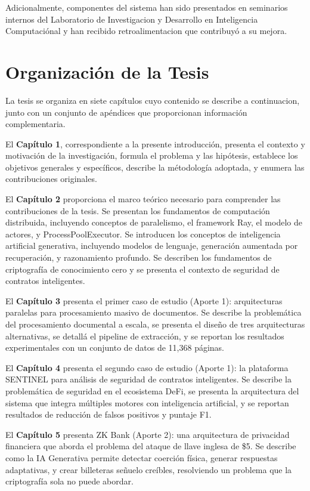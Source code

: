 \documentclass[12pt,a4paper,twoside]{book}
\begin{document}
Adicionalmente, componentes del sistema han sido presentados en seminarios internos del Laboratorio de Investigacion y Desarrollo en Inteligencia Computaciónal y han recibido retroalimentacion que contribuyó a su mejora.

\section{Organización de la Tesis}

La tesis se organiza en siete capítulos cuyo contenido se describe a continuacion, junto con un conjunto de apéndices que proporcionan información complementaria.

El \textbf{Capítulo 1}, correspondiente a la presente introducción, presenta el contexto y motivación de la investigación, formula el problema y las hipótesis, establece los objetivos generales y específicos, describe la métodología adoptada, y enumera las contribuciones originales.

El \textbf{Capítulo 2} proporciona el marco teórico necesario para comprender las contribuciones de la tesis. Se presentan los fundamentos de computación distribuida, incluyendo conceptos de paralelismo, el framework Ray, el modelo de actores, y ProcessPoolExecutor. Se introducen los conceptos de inteligencia artificial generativa, incluyendo modelos de lenguaje, generación aumentada por recuperación, y razonamiento profundo. Se describen los fundamentos de criptografía de conocimiento cero y se presenta el contexto de seguridad de contratos inteligentes.

El \textbf{Capítulo 3} presenta el primer caso de estudio (Aporte 1): arquitecturas paralelas para procesamiento masivo de documentos. Se describe la problemática del procesamiento documental a escala, se presenta el diseño de tres arquitecturas alternativas, se detallá el pipeline de extracción, y se reportan los resultados experimentales con un conjunto de datos de 11,368 páginas.

El \textbf{Capítulo 4} presenta el segundo caso de estudio (Aporte 1): la plataforma SENTINEL para análisis de seguridad de contratos inteligentes. Se describe la problemática de seguridad en el ecosistema DeFi, se presenta la arquitectura del sistema que integra múltiples motores con inteligencia artificial, y se reportan resultados de reducción de falsos positivos y puntaje F1.

El \textbf{Capítulo 5} presenta ZK Bank (Aporte 2): una arquitectura de privacidad financiera que aborda el problema del ataque de llave inglesa de \$5. Se describe como la IA Generativa permite detectar coerción física, generar respuestas adaptativas, y crear billeteras señuelo creíbles, resolviendo un problema que la criptografía sola no puede abordar.
\end{document}

